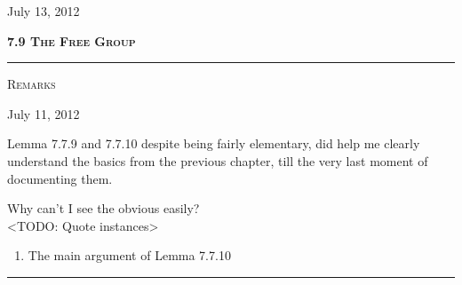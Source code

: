 \documentclass[12pt]{article}
\begin{document}
\begin{flushright} {\small July 13, 2012} \end{flushright}
\textbf {\textsc {7.9 The Free Group}}
\vspace{500pt}
\hrule
\vspace{12pt}
\begin{center}
{\textsc {Remarks}}
\end{center}

\begin{flushright} {\small July 11, 2012} \end{flushright}
Lemma 7.7.9 and 7.7.10 despite being fairly elementary, did help me clearly understand the basics from the previous chapter, till the very last moment of documenting them.
\par
Why can't I see the obvious easily?\\
<TODO: Quote instances>
\begin{enumerate}
\item The main argument of Lemma 7.7.10
\end{enumerate}
\vspace{12pt}
\hrule
\end{document}
